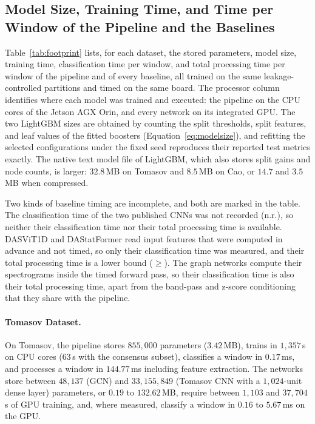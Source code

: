 \subsection{Model Size, Training Time, and Time per Window of the Pipeline and the Baselines}
\label{sec:resFootprint}
Table~\ref{tab:footprint} lists, for each dataset, the stored parameters, model size, training time, classification time per window, and total processing time per window of the pipeline and of every baseline, all trained on the same leakage-controlled partitions and timed on the same board. The processor column identifies where each model was trained and executed: the pipeline on the CPU cores of the Jetson AGX Orin, and every network on its integrated GPU. The two LightGBM sizes are obtained by counting the split thresholds, split features, and leaf values of the fitted boosters (Equation~\eqref{eq:modelsize}), and refitting the selected configurations under the fixed seed reproduces their reported test metrics exactly. The native text model file of LightGBM, which also stores split gains and node counts, is larger: $32.8$\,MB on Tomasov and $8.5$\,MB on Cao, or $14.7$ and $3.5$\,MB when compressed.

Two kinds of baseline timing are incomplete, and both are marked in the table. The classification time of the two published CNNs was not recorded (n.r.), so neither their classification time nor their total processing time is available. DASViT1D and DAStatFormer read input features that were computed in advance and not timed, so only their classification time was measured, and their total processing time is a lower bound ($\geq$). The graph networks compute their spectrograms inside the timed forward pass, so their classification time is also their total processing time, apart from the band-pass and z-score conditioning that they share with the pipeline.

\paragraph[Tomasov Dataset]{Tomasov Dataset.}
On Tomasov, the pipeline stores $855{,}000$ parameters ($3.42$\,MB), trains in $1{,}357$\,s on CPU cores ($63$\,s with the consensus subset), classifies a window in $0.17$\,ms, and processes a window in $144.77$\,ms including feature extraction. The networks store between $48{,}137$ (GCN) and $33{,}155{,}849$ (Tomasov CNN with a $1{,}024$-unit dense layer) parameters, or $0.19$ to $132.62$\,MB, require between $1{,}103$ and $37{,}704$\,s of GPU training, and, where measured, classify a window in $0.16$ to $5.67$\,ms on the GPU.

